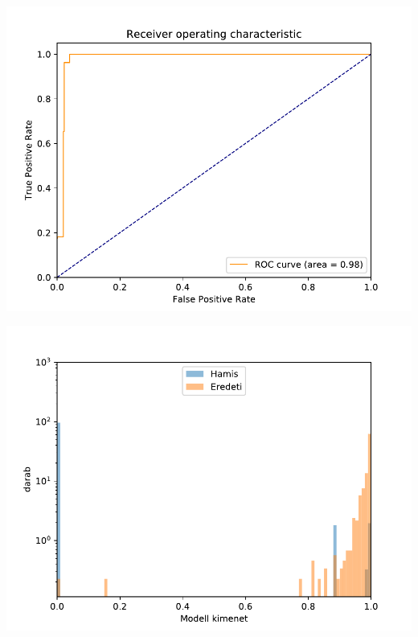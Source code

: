 \documentclass[11pt]{beamer}
\begin{document}
\begin{frame}
\begin{columns} [t]
\begin{column}{.5\textwidth}
			\includegraphics[scale=0.25]{roc-curve-full-dataset-ujratanitva.pdf}
			
			\includegraphics[scale=0.25]{histogram-ujratanitott-log-skala-full.pdf}
			
		\end{column}				
	\end{columns}



%	
%		
%		
%			
%			


\end{frame}
\end{document}
